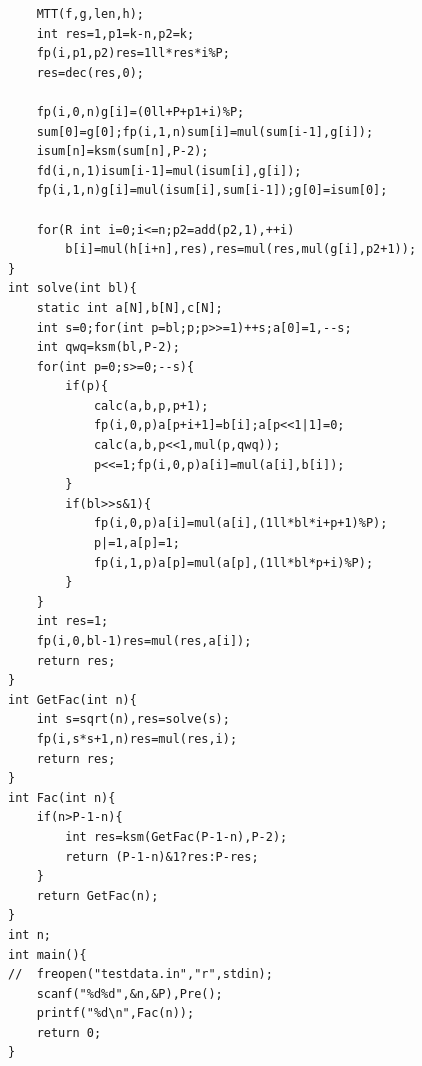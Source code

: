 \documentclass[twoside]{article}
\begin{document}
\begin{lstlisting}
    MTT(f,g,len,h);
    int res=1,p1=k-n,p2=k;
    fp(i,p1,p2)res=1ll*res*i%P;
    res=dec(res,0);
    
    fp(i,0,n)g[i]=(0ll+P+p1+i)%P;
    sum[0]=g[0];fp(i,1,n)sum[i]=mul(sum[i-1],g[i]);
    isum[n]=ksm(sum[n],P-2);
    fd(i,n,1)isum[i-1]=mul(isum[i],g[i]);
    fp(i,1,n)g[i]=mul(isum[i],sum[i-1]);g[0]=isum[0];
    
    for(R int i=0;i<=n;p2=add(p2,1),++i)
        b[i]=mul(h[i+n],res),res=mul(res,mul(g[i],p2+1));
}
int solve(int bl){
    static int a[N],b[N],c[N];
    int s=0;for(int p=bl;p;p>>=1)++s;a[0]=1,--s;
    int qwq=ksm(bl,P-2);
    for(int p=0;s>=0;--s){
        if(p){
            calc(a,b,p,p+1);
            fp(i,0,p)a[p+i+1]=b[i];a[p<<1|1]=0;
            calc(a,b,p<<1,mul(p,qwq));
            p<<=1;fp(i,0,p)a[i]=mul(a[i],b[i]);
        }
        if(bl>>s&1){
            fp(i,0,p)a[i]=mul(a[i],(1ll*bl*i+p+1)%P);
            p|=1,a[p]=1;
            fp(i,1,p)a[p]=mul(a[p],(1ll*bl*p+i)%P);
        }
    }
    int res=1;
    fp(i,0,bl-1)res=mul(res,a[i]);
    return res;
}
int GetFac(int n){
    int s=sqrt(n),res=solve(s);
    fp(i,s*s+1,n)res=mul(res,i);
    return res;
}
int Fac(int n){
    if(n>P-1-n){
        int res=ksm(GetFac(P-1-n),P-2);
        return (P-1-n)&1?res:P-res;
    }
    return GetFac(n);
}
int n;
int main(){
//  freopen("testdata.in","r",stdin);
    scanf("%d%d",&n,&P),Pre();
    printf("%d\n",Fac(n));
    return 0;
}\end{lstlisting}
\end{document}
